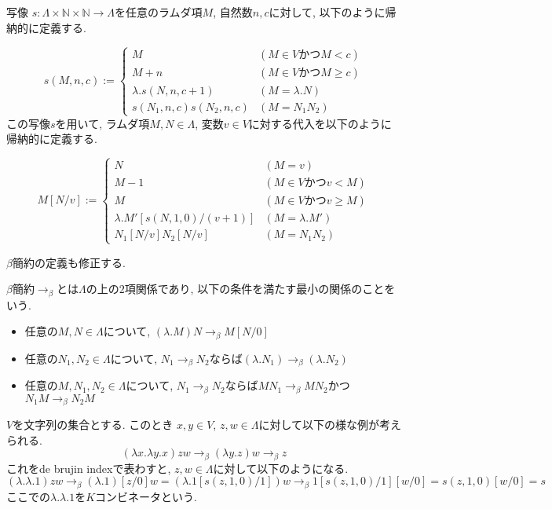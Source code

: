 \documentclass{ltjsarticle}
\begin{document}
\begin{defn}
 写像 $s \colon \Lambda \times \mathbb{N} \times \mathbb{N} \rightarrow \Lambda$を任意のラムダ項$M$, 自然数$n, c$に対して, 以下のように帰納的に定義する.
 
\[
  s (M, n, c) := \begin{cases}
    M & (M \in V \text{かつ} M < c) \\
    M + n & (M \in V \text{かつ} M \geq c) \\
    \lambda. s (N, n, c + 1) & (M = \lambda. N) \\
    s (N_1, n, c) s (N_2, n, c) & (M = N_1 N_2)
  \end{cases}
\]
 この写像$s$を用いて, ラムダ項$M, N \in \Lambda$, 変数$v \in V$に対する代入を以下のように帰納的に定義する.
 
\[
 M[N/v] := \begin{cases}
    N & (M = v) \\
    M - 1 & (M \in V \text{かつ} v < M) \\
    M & (M \in V \text{かつ} v \geq M) \\
    \lambda. M' [s (N, 1, 0)/(v + 1)] & (M = \lambda. M') \\
    N_1[N/v] N_2[N/v] & (M = N_1 N_2)
  \end{cases}
\]
\end{defn}

$\beta$簡約の定義も修正する.

\begin{defn}
 $\beta$簡約$\rightarrow_{\beta}$とは$\Lambda$の上の$2$項関係であり, 以下の条件を満たす最小の関係のことをいう.
 \begin{itemize}
  \item 任意の$M, N \in \Lambda$について, $(\lambda. M) N \rightarrow_\beta M[N/0]$
  \item 任意の$N_1, N_2 \in \Lambda$について, $N_1 \rightarrow_\beta N_2$ならば$(\lambda. N_1) \rightarrow_\beta (\lambda. N_2)$
  \item 任意の$M, N_1, N_2 \in \Lambda$について, $N_1 \rightarrow_\beta N_2$ならば$M N_1 \rightarrow_\beta M N_2$かつ$N_1 M \rightarrow_\beta N_2 M$
 \end{itemize}
\end{defn}

\begin{ex}[$K$ コンビネータ]
 $V$を文字列の集合とする. このとき $x, y \in V$, $z, w \in \Lambda$に対して以下の様な例が考えられる.
 \[
 (\lambda x. \lambda y. x) z w \rightarrow_{\beta} (\lambda y. z) w \rightarrow_{\beta} z
 \]
 これをde brujin indexで表わすと, $z, w \in \Lambda$に対して以下のようになる.
 \[
 (\lambda. \lambda. 1) z w \rightarrow_{\beta} (\lambda. 1)[z/0] w = (\lambda. 1[s (z, 1, 0)/1]) w \rightarrow_{\beta} 1[s (z, 1, 0)/1][w/0] = s (z, 1, 0)[w/0] = s
 \]
ここでの$\lambda. \lambda. 1$を$K$コンビネータという.
\end{ex}
\end{document}
